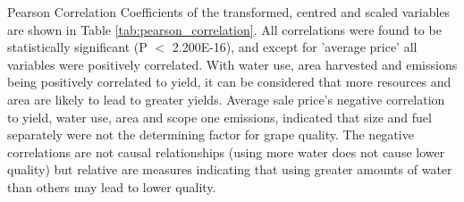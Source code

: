 \documentclass[review,12pt,authoryear]{elsarticle}
\begin{document}
\begin{linenumbers}
Pearson Correlation Coefficients of the transformed, centred and scaled variables are shown in Table \ref{tab:pearson_correlation}. All correlations were found to be statistically significant (P $<$ 2.200E-16), and except for 'average price' all variables were positively correlated. With water use, area harvested and emissions being positively correlated to yield, it can be considered that more resources and area are likely to lead to greater yields. Average sale price's negative correlation to yield, water use, area and scope one emissions, indicated that size and fuel separately were not the determining factor for grape quality. The negative correlations are not causal relationships (using more water does not cause lower quality) but relative are measures indicating that using greater amounts of water than others may lead to lower quality.
\par
\begin{table}[]
  \caption{Pairwise Pearson correlation coefficients for logarithmically transformed values.}\label{tab:pearson_correlation}
\end{table}
\end{linenumbers}
\end{document}
